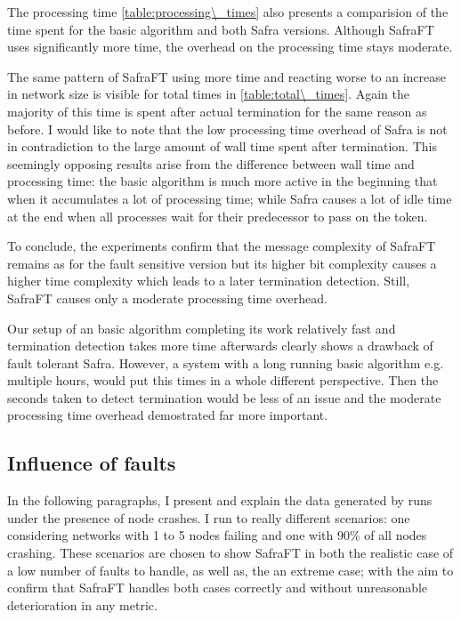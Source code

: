 The processing time \cref{table:processing\_times} also presents a comparision of the time spent for the basic algorithm and both Safra versions.
Although SafraFT uses significantly more time, the overhead on the processing time stays moderate.

The same pattern of SafraFT using more time and reacting worse to an increase in network size is visible for total times in \cref{table:total\_times}.
Again the majority of this time is spent after actual termination for the same reason as before.
I would like to note that the low processing time overhead of Safra is not in contradiction to the large amount of wall time spent after termination.
This seemingly opposing results arise from the difference between wall time and processing time: the basic algorithm is much more active in the beginning that when it accumulates a lot of processing time; while Safra causes a lot of idle time at the end when all processes wait for their predecessor to pass on the token.

To conclude, the experiments confirm that the message complexity of SafraFT remains as for the fault sensitive version but its higher bit complexity causes a higher time complexity which leads to a later termination detection. 
Still, SafraFT causes only a moderate processing time overhead.

Our setup of an basic algorithm completing its work relatively fast and termination detection takes more time afterwards clearly shows a drawback of fault tolerant Safra.
However, a system with a long running basic algorithm e.g. multiple hours, would put this times in a whole different perspective.
Then the seconds taken to detect termination would be less of an issue and the moderate processing time overhead demostrated far more important.


\subsection{Influence of faults}
In the following paragraphs, I present and explain the data generated by runs under the presence of node crashes.
I run to really different scenarios: one considering networks with 1 to 5 nodes failing and one with 90\% of all nodes crashing.
These scenarios are chosen to show SafraFT in both the realistic case of a low number of faults to handle, as well as, the an extreme case; with the aim to confirm that SafraFT handles both cases correctly and
without unreasonable deterioration in any metric.

